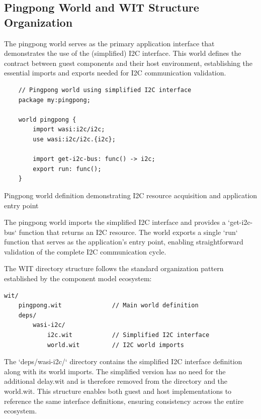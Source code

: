 \subsection{Pingpong World and WIT Structure Organization}

The pingpong world serves as the primary application interface that demonstrates the use of the (simplified) I2C interface. This world defines the contract between guest components and their host environment, establishing the essential imports and exports needed for I2C communication validation.

\begin{listing}[H]
    \begin{verbatim}
    // Pingpong world using simplified I2C interface
    package my:pingpong;
    
    world pingpong {
        import wasi:i2c/i2c;
        use wasi:i2c/i2c.{i2c};
    
        import get-i2c-bus: func() -> i2c;
        export run: func();
    }
    \end{verbatim}
    \caption{Pingpong world definition demonstrating I2C resource acquisition and application entry point}
    \label{lst:pingpong-world}
\end{listing}

The pingpong world imports the simplified I2C interface and provides a `get-i2c-bus` function that returns an I2C resource. The world exports a single `run` function that serves as the application's entry point, enabling straightforward validation of the complete I2C communication cycle.

The WIT directory structure follows the standard organization pattern established by the component model ecosystem:

\begin{verbatim}
wit/
    pingpong.wit              // Main world definition
    deps/
        wasi-i2c/
            i2c.wit           // Simplified I2C interface
            world.wit         // I2C world imports
\end{verbatim}

The `deps/wasi-i2c/` directory contains the simplified I2C interface definition along with its world imports. The simplified version has no need for the additional delay.wit and is therefore removed from the directory and the world.wit. This structure enables both guest and host implementations to reference the same interface definitions, ensuring consistency across the entire ecosystem.

